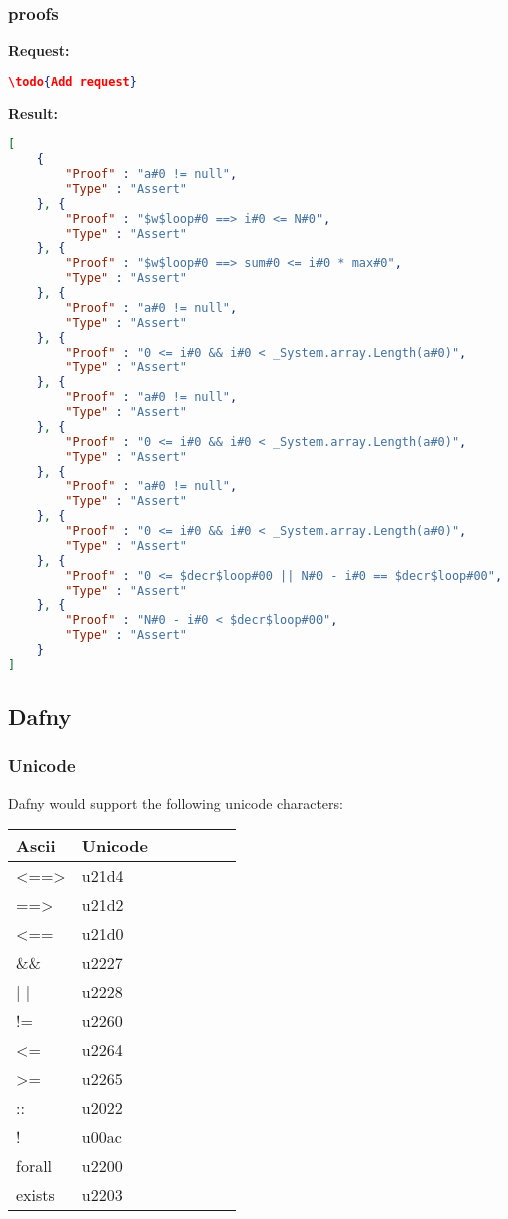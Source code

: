 \subsubsection{proofs}
\textbf{Request: }
\begin{lstlisting}[language=json,firstnumber=1]
\todo{Add request}
\end{lstlisting}

\textbf{Result: }
\begin{lstlisting}[language=json,firstnumber=1]
[
	{
		"Proof" : "a#0 != null",
		"Type" : "Assert"
	}, {
		"Proof" : "$w$loop#0 ==> i#0 <= N#0",
		"Type" : "Assert"
	}, {
		"Proof" : "$w$loop#0 ==> sum#0 <= i#0 * max#0",
		"Type" : "Assert"
	}, {
		"Proof" : "a#0 != null",
		"Type" : "Assert"
	}, {
		"Proof" : "0 <= i#0 && i#0 < _System.array.Length(a#0)",
		"Type" : "Assert"
	}, {
		"Proof" : "a#0 != null",
		"Type" : "Assert"
	}, {
		"Proof" : "0 <= i#0 && i#0 < _System.array.Length(a#0)",
		"Type" : "Assert"
	}, {
		"Proof" : "a#0 != null",
		"Type" : "Assert"
	}, {
		"Proof" : "0 <= i#0 && i#0 < _System.array.Length(a#0)",
		"Type" : "Assert"
	}, {
		"Proof" : "0 <= $decr$loop#00 || N#0 - i#0 == $decr$loop#00",
		"Type" : "Assert"
	}, {
		"Proof" : "N#0 - i#0 < $decr$loop#00",
		"Type" : "Assert"
	}
]
\end{lstlisting}



\subsection{Dafny}

\subsubsection{Unicode}
Dafny would support the following unicode characters: 

\begin{longtable}[H]
	{l|p{}| p{} | p{} | p{} | p{} | p{}}
	
	\textbf{Ascii} & \textbf{Unicode}  \\ \hline
	<==> & u21d4  \\  
	==> & u21d2  \\  
	<== & u21d0  \\  
	\&\& & u2227  \\  
	| | & u2228  \\  
	!= & u2260  \\  
	<= & u2264  \\  
	>= & u2265  \\  
	:: & u2022  \\  
	! & u00ac  \\  
	forall & u2200  \\  
	exists & u2203  
	
	
\end{longtable}

